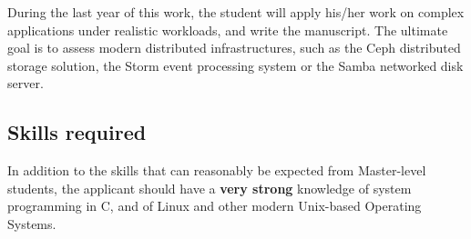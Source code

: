 \documentclass[a4paper,11pt]{article}
\begin{document}
During the last year of this work, the student will apply his/her work
on complex applications under realistic workloads, and write the
manuscript. The ultimate goal is to assess modern distributed
infrastructures, such as the Ceph distributed storage solution, the
Storm event processing system or the Samba networked disk server.





\subsection*{Skills required}

In addition to the skills that can reasonably be expected from Master-level
students, the applicant should have a \textbf{very strong} knowledge of system
programming in C, and of Linux and other modern Unix-based Operating Systems.
\end{document}
